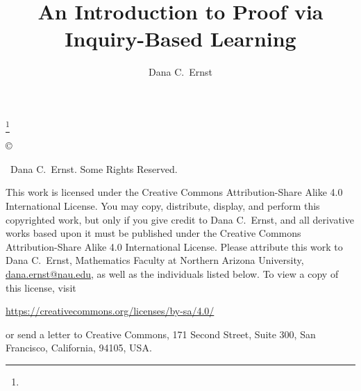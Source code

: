 \documentclass{spectrum}
\theoremstyle{definition}
\begin{document}
\title{An Introduction to Proof via Inquiry-Based Learning}
\author{Dana C.~Ernst}
\thanks{}

\maketitle

\noindent\copyright{ \the\year\ Dana C.~Ernst.  Some Rights Reserved.\\

\bigskip

\noindent This work is licensed under the Creative Commons Attribution-Share Alike 4.0 International License.  You may copy, distribute, display, and perform this copyrighted work, but only if you give credit to Dana C.~Ernst, and all derivative works based upon it must be published under the Creative Commons Attribution-Share Alike 4.0 International License. Please attribute this work to Dana C.~Ernst, Mathematics Faculty at Northern Arizona University, \url{dana.ernst@nau.edu}, as well as the individuals listed below. To view a copy of this license, visit
\begin{center}
\url{https://creativecommons.org/licenses/by-sa/4.0/}
\end{center}
or send a letter to Creative Commons, 171 Second Street, Suite 300, San Francisco, California, 94105, USA.}

\medskip

\begin{center}
\ccbysa
\end{center}

\setcounter{page}{5}

\tableofcontents

\mainmatter
































%


 










\appendix




\end{document}
